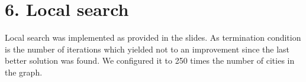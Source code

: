 \section*{6. Local search}
Local search was implemented as provided in the slides. As termination condition is the number of iterations which yielded not to an improvement since the last better solution was found. We configured it to 250 times the number of cities in the graph.